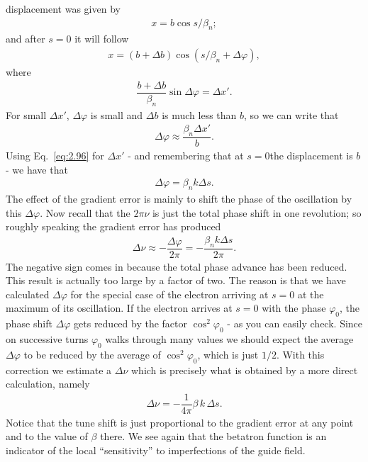 displacement was given by
\begin{align}
	x = b \cos s/\beta_n;
\end{align}
and after $s = 0$ it will follow
\begin{align}
	x = (b + \Delta b) \cos(s/\beta_n+\Delta\varphi),
\end{align}
where
\begin{align}
	\dfrac{b+\Delta b}{\beta_n} \sin\Delta\varphi = \Delta x'.
\end{align}
For small $\Delta x'$, $\Delta \varphi$ is small and $\Delta b$ is much less than $b$, so we can write that
\begin{align}
	\Delta \varphi \approx \dfrac{\beta_n \Delta x'}{b}.
\end{align}
Using Eq.~\eqref{eq:2.96} for $\Delta x'$ - and remembering that at $s=0$the displacement is $b$ - we have that
\begin{align}
	\Delta \varphi = \beta_n k \Delta s.
\end{align}
The effect of the gradient error is mainly to shift the phase of the oscillation by this $\Delta \varphi$. Now recall that the $2\pi\nu$ is just the total phase shift in one revolution; so roughly speaking the gradient error has produced
\begin{align}
	\Delta\nu \approx -\dfrac{\Delta\varphi}{2\pi} = - \dfrac{\beta_n k \Delta s }{2\pi}.
\end{align}
The negative sign comes in because the total phase advance has been reduced.\\
This result is actually too large by a factor of two. The reason is that we have calculated $\Delta \varphi$ for the special case of the electron arriving at $s = 0$ at the maximum
of its oscillation. If the electron arrives at $s = 0$ with the phase $\varphi_0$, the phase
shift $\Delta\varphi$ gets reduced by the factor $\cos^2\varphi_0$ - as you can easily check.
 Since on successive turns $\varphi_0$ walks through many values we should expect the average $\Delta \varphi$ to be reduced by the average of $\cos^2\varphi_0$, which is just $1/2$. With this correction we estimate a $\Delta\nu$ which is precisely what is obtained by a more direct calculation, namely
\begin{align}
	\Delta\nu = -\dfrac{1}{4\pi}\beta\, k\, \Delta s.
\end{align}
Notice that the tune shift is just proportional to the gradient error at any point and to the value of $\beta$ there. We see again that the betatron function is an indicator of the local ``sensitivity'' to imperfections of the guide field.\\
